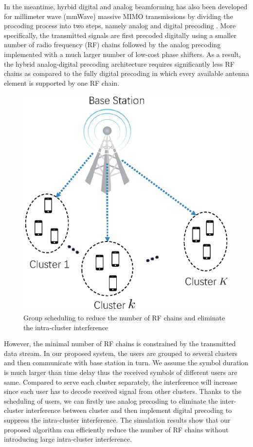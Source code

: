 \documentclass[conference]{IEEEtran}
\begin{document}
In the meantime, hyrbid digital and analog beamforming has also been developed for millimeter wave (mmWave) massive MIMO transmissions by dividing the procoding process into two steps, namely analog and digital precoding \cite{han2015large, el2014spatially}. More specifically, the transmitted signals are first precoded digitally using a smaller number of radio frequency (RF) chains followed by the analog precoding implemented with a much larger number of low-cost phase shifters. As a result, the hybrid analog-digital precoding architecture requires significantly less RF chains as compared to the fully digital precoding in which every available antenna element is supported by one RF chain. 

\begin{figure}[h]
	\begin{center}
		\includegraphics[scale=0.55]{PPTFigure/groupcluster.eps}
		\caption{Group scheduling to reduce the number of RF chains and eliminate the intra-cluster interference}\label{fig:BDMA}
	\end{center}
\end{figure}

{\color{red}However, the minimal number of RF chains is constrained by the transmitted data stream. In our proposed system, the users are grouped to several clusters and then communicate with base station in turn. We assume the symbol duration is much larger than time delay thus the received symbols of different users are same. Compared to serve each cluster separately, the interference will increase since each user has to decode received signal from other clusters. Thanks to the scheduling of users, we can firstly use analog precoding to eliminate the inter-cluster interference between cluster and then implement digital precoding to suppress the intra-cluster interference. The simulation results show that our proposed algorithm can efficiently reduce the number of RF chains without introducing large intra-cluster interference.} 
\end{document}
